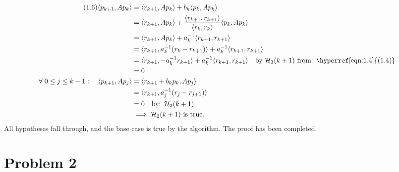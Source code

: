 \documentclass[]{article}
\begin{document}
    \begin{align*}\tag{1.6}\label{eqn:1.6}
        \langle p_{k + 1}, Ap_k\rangle &= 
        \langle r_{k + 1}, Ap_k\rangle + b_k\langle  p_k, Ap_k\rangle
        \\
        &= \langle r_{k + 1}, Ap_k\rangle + 
        \frac{\langle r_{k + 1}, r_{k + 1}\rangle}{\langle r_k, r_k\rangle}\langle p_k, Ap_k\rangle
        \\
        &= \langle r_{k + 1}, Ap_k\rangle + 
        a_k^{-1}\langle r_{k + 1}, r_{k + 1}\rangle
        \\
        &= \langle r_{k + 1}, a_{k}^{-1}(r_k - r_{k + 1})\rangle + 
        a_k^{-1}\langle r_{k + 1}, r_{k + 1}\rangle
        \\
        &= \langle r_{k + 1}, - a_{k}^{-1}r_{k + 1}\rangle + 
        a_k^{-1}\langle r_{k + 1}, r_{k + 1}\rangle \quad \text{by }\mathcal{H}_3(k + 1) \text{ from: \hyperref[eqn:1.4]{(1.4)}}
        \\
        &= 0
        \\
        \forall\; 0 \le j \le k - 1: \quad 
        \langle p_{k + 1}, Ap_j\rangle &= \langle r_{k + 1} + b_kp_k, Ap_j\rangle
        \\
        &= \langle r_{k + 1}, a_j^{-1}(r_j - r_{j + 1})\rangle
        \\
        &= 0 \quad \text{by: } \mathcal{H}_3(k + 1)
        \\
        & \implies \mathcal{H}_2(k + 1)\text{ is true}.
    \end{align*}
    All hypotheses fall through, and the base case is true by the algorithm. The proof has been completed. 

\section*{Problem 2}
    
\end{document}
